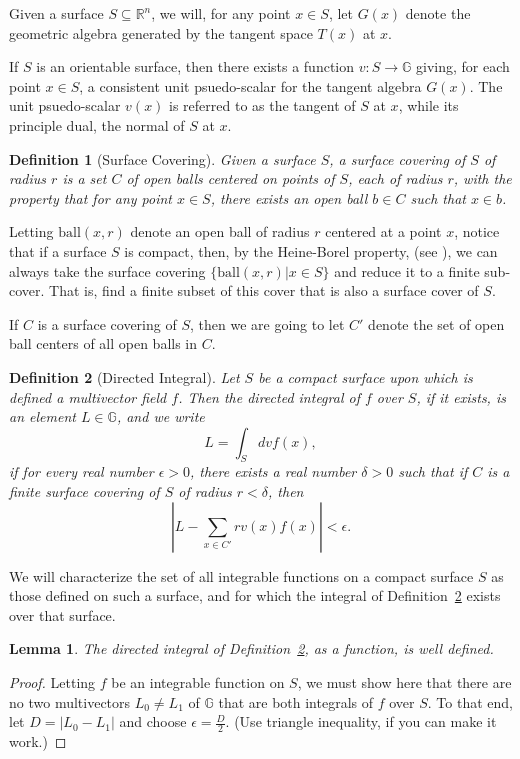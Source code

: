 \documentclass[12pt]{article}
\numberwithin{equation}{section}
\newcommand{\G}{\mathbb{G}}
\newcommand{\R}{\mathbb{R}}
\newtheorem{definition}{Definition}[section]
\newtheorem{lemma}{Lemma}[section]
\begin{document}
Given a surface $S\subseteq\R^n$, we will, for any point $x\in S$, let $G(x)$ denote the geometric
algebra generated by the tangent space $T(x)$ at $x$.

If $S$ is an orientable surface, then there exists a function $v:S\to\G$ giving, for
each point $x\in S$, a consistent unit psuedo-scalar for the tangent algebra $G(x)$.
The unit psuedo-scalar $v(x)$ is referred to as the tangent of $S$ at $x$, while its
principle dual, the normal of $S$ at $x$.

\begin{definition}[Surface Covering]\label{def_surface_covering}
Given a surface $S$, a surface covering of $S$ of radius $r$ is a set $C$ of open
balls centered on points of $S$, each of radius $r$, with the property that for any point
$x\in S$, there exists an open ball $b\in C$ such that $x\in b$.
\end{definition}

Letting $\mbox{ball}(x,r)$ denote an open ball of radius $r$
centered at a point $x$, notice that if a surface $S$ is compact, then, by the Heine-Borel property,
(see \cite{}), we can always take the surface covering $\{\mbox{ball}(x,r)|x\in S\}$ and
reduce it to a finite sub-cover.  That is, find a finite subset of this cover that is
also a surface cover of $S$.

If $C$ is a surface covering of $S$, then we are going to let $C'$ denote
the set of open ball centers of all open balls in $C$.

\begin{definition}[Directed Integral]\label{def_directed_integral}
Let $S$ be a compact surface upon which is defined a multivector field $f$.
Then the directed integral of $f$ over $S$, if it exists, is an element $L\in\G$, and we write
\begin{equation*}
L = \int_S dv f(x),
\end{equation*}
if for every real number $\epsilon>0$, there exists a real number $\delta>0$ such
that if $C$ is a finite surface covering of $S$ of radius $r<\delta$, then
\begin{equation*}
\left|L - \sum_{x\in C'} r v(x)f(x)\right|<\epsilon.
\end{equation*}
\end{definition}

We will characterize the set of all integrable functions on a compact surface $S$ as those defined
on such a surface, and for which
the integral of Definition~\ref{def_directed_integral} exists over that surface.

\begin{lemma}
The directed integral of Definition~\ref{def_directed_integral}, as a function, is well defined.
\end{lemma}
\begin{proof}
Letting $f$ be an integrable function on $S$, we must show here that there
are no two multivectors $L_0\neq L_1$ of $\G$ that are both integrals of $f$ over $S$.
To that end, let $D=|L_0-L_1|$ and choose $\epsilon = \frac{D}{2}$.  (Use triangle inequality,
if you can make it work.)
\end{proof}
\end{document}
